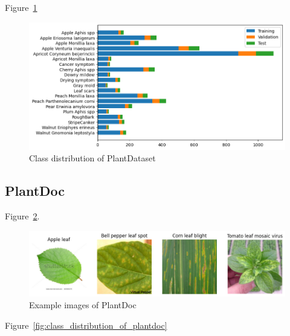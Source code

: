 Figure~\ref{fig:class_distribution_of_plantdataset}

\begin{figure}[H]
    \begin{center}
    \includegraphics[width=15cm]{../images/class_distribution_of_plantdataset.png}
    \caption{Class distribution of PlantDataset}
   \label{fig:class_distribution_of_plantdataset}
    \end{center}
\end{figure}

\subsection{PlantDoc}
Figure~\ref{fig:example_images_of_plantdoc}.

\begin{figure}[H]
    \begin{center}
    \includegraphics[width=15cm]{../images/example_images_of_plantdoc.png}
    \caption{Example images of PlantDoc}
   \label{fig:example_images_of_plantdoc}
    \end{center}
\end{figure}

Figure~\ref{fig:class_distribution_of_plantdoc}

